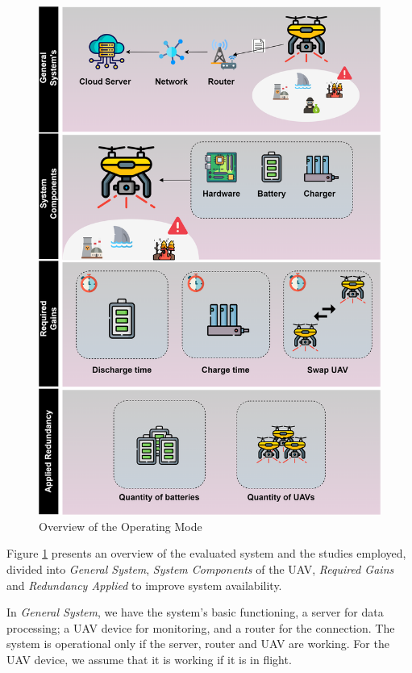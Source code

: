\documentclass[conference]{IEEEtran}
\begin{document}
\begin{figure}[htbp]
\centerline{\includegraphics[scale=0.45]{img/operating_model.png}}
\caption{Overview of the Operating Mode}
\label{fig:operating_mode_overview}
\end{figure}

Figure \ref{fig:operating_mode_overview} presents an overview of the evaluated system and the studies employed, divided into \textit{General System}, \textit{System Components} of the UAV, \textit{Required Gains} and \textit{Redundancy Applied} to improve system availability.

In \textit{General System}, we have the system's basic functioning, a server for data processing; a UAV device for monitoring, and a router for the connection. The system is operational only if the server, router and UAV are working. For the UAV device, we assume that it is working if it is in flight.
\end{document}
